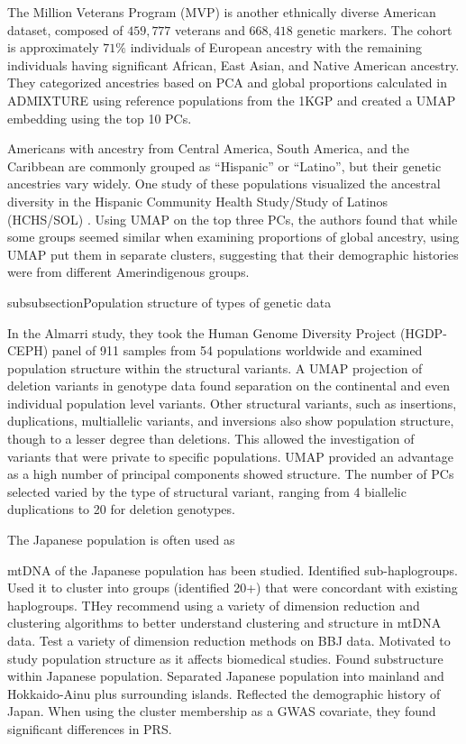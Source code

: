 \documentclass[12pt]{article}
\begin{document}
The Million Veterans Program (MVP) is another ethnically diverse American dataset, composed of $459,777$ veterans and $668,418$ genetic markers. The cohort is approximately $71\%$ individuals of European ancestry with the remaining individuals having significant African, East Asian, and Native American ancestry. They categorized ancestries based on PCA and global proportions calculated in ADMIXTURE using reference populations from the 1KGP and created a UMAP embedding using the top 10 PCs.\cite{hunter-zinck_genotyping_2020}

Americans with ancestry from Central America, South America, and the Caribbean are commonly grouped as ``Hispanic'' or ``Latino'', but their genetic ancestries vary widely. One study of these populations visualized the ancestral diversity in the Hispanic Community Health Study/Study of Latinos (HCHS/SOL) \cite{sorlie2010design}. Using UMAP on the top three PCs, the authors found that while some groups seemed similar when examining proportions of global ancestry, using UMAP put them in separate clusters, suggesting that their demographic histories were from different Amerindigenous groups.\cite{spear2020recent}

\*subsubsection{Population structure of types of genetic data}

In the Almarri study, they took the Human Genome Diversity Project (HGDP-CEPH) panel of 911 samples from 54 populations worldwide and examined population structure within the structural variants. A UMAP projection of deletion variants in genotype data found separation on the continental and even individual population level variants. Other structural variants, such as insertions, duplications, multiallelic variants, and inversions also show population structure, though to a lesser degree than deletions. This allowed the investigation of variants that were private to specific populations. UMAP provided an advantage as a high number of principal components showed structure. The number of PCs selected varied by the type of structural variant, ranging from 4 biallelic duplications to 20 for deletion genotypes.\cite{almarri_population_2020}

The Japanese population is often used as 

mtDNA of the Japanese population has been studied. Identified sub-haplogroups. Used it to cluster into groups (identified 20+) that were concordant with existing haplogroups. THey recommend using a variety of dimension reduction and clustering algorithms to better understand clustering and structure in mtDNA data.\cite{yamamoto_genetic_2020} Test a variety of dimension reduction methods on BBJ data. Motivated to study population structure as it affects biomedical studies. Found substructure within Japanese population. Separated Japanese population into mainland and Hokkaido-Ainu plus surrounding islands. Reflected the demographic history of Japan. When using the cluster membership as a GWAS covariate, they found significant differences in PRS.\cite{sakaue_dimensionality_2020}
\end{document}
